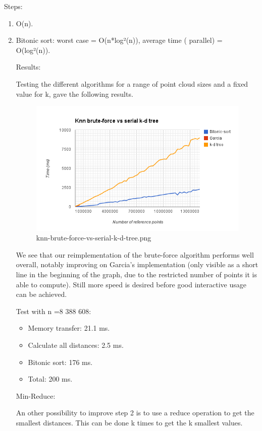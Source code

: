 Steps:
\begin{enumerate}
    \item O(n).
    \item Bitonic sort: worst case = O(n*log²(n)), average time ( parallel) = O(log²(n)).
\begin{enumerate}

Results:

Testing the different algorithms for a range of point cloud sizes and a fixed value for k, gave the following results.

\begin{figure}[ht!]
\centering
\includegraphics[width=120mm]{gfx/knn-brute-force-vs-serial-k-d-tree.png}

\caption{knn-brute-force-vs-serial-k-d-tree.png}
\label{fig:knn_brute_force_vs_serial_k_d_tree}
\end{figure}

We see that our reimplementation of the brute-force algorithm performs well overall, notably improving on Garcia's implementation (only visible as a short line in the beginning of the graph, due to the restricted number of points it is able to compute). Still more speed is desired before good interactive usage can be achieved.

Test with n =8 388 608:

\begin{itemize}
    \item Memory transfer:  21.1 ms.
    \item Calculate all distances: 2.5 ms.
    \item Bitonic sort:  176 ms.
    \item Total: 200 ms.
\end{itemize}

Min-Reduce:

An other possibility to improve step 2 is to use a reduce operation to get the smallest distances. This can be done k times to get the k smallest values.


\end{enumerate}
\end{enumerate}
